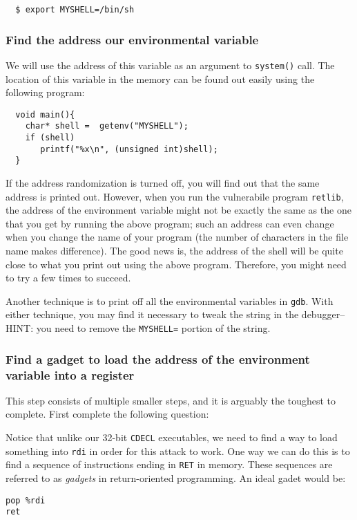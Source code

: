 \begin{verbatim}
  $ export MYSHELL=/bin/sh
\end{verbatim}

\subsubsection{Find the address our environmental variable}
We will use the address of this variable as an argument to {\tt system()} call.
The location of this variable in the memory can be found out easily using the 
following program: 
\begin{verbatim}
  void main(){
    char* shell =  getenv("MYSHELL");
    if (shell) 
       printf("%x\n", (unsigned int)shell);
  }
\end{verbatim}

If the address randomization is turned off, you will find out that the same 
address is printed out. However, when you run the 
vulnerabile program {\tt retlib}, the address of the environment
variable might not be exactly the same as the one that you get by running 
the above program; such an address can even change when you change
the name of your program (the number of characters in the file
name makes difference). The good news is, the address of the shell will
be quite close to what you print out using the above program. Therefore,
you might need to try a few times to succeed. 

Another technique is to print off all the environmental variables in {\tt gdb}.  With either technique, you may find it necessary to tweak the string in the debugger--HINT: you need to remove the {\tt MYSHELL=} portion of the string.

\subsubsection{Find a gadget to load the address of the environment variable into a register}
This step consists of multiple smaller steps, and it is arguably the toughest to complete.  First complete the following question:


Notice that unlike our 32-bit {\tt CDECL} executables, we need to find a way to load something into {\tt rdi} in order for this attack to work.  One way we can do this is to find a sequence of instructions ending in {\tt RET} in memory.  These sequences are referred to as \textit{gadgets} in return-oriented programming.  An ideal gadet would be:
\begin{verbatim}
pop %rdi
ret
\end{verbatim}

